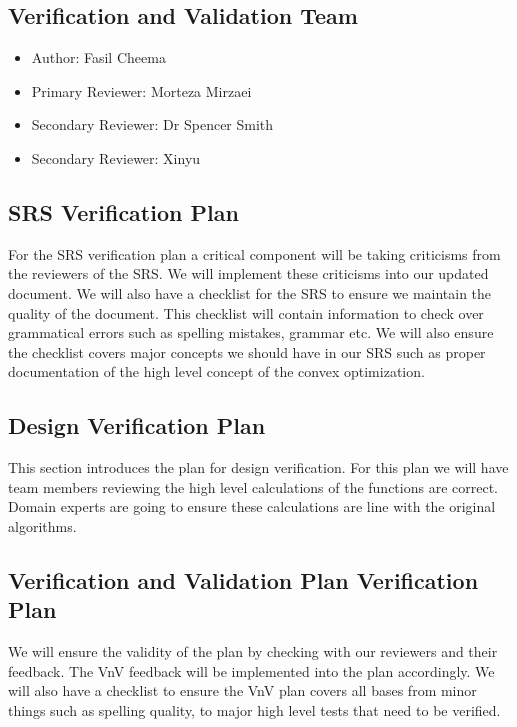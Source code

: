 \documentclass[12pt, titlepage]{article}
\begin{document}
\subsection{Verification and Validation Team}

\begin{itemize}
  \item Author: Fasil Cheema
  \item Primary Reviewer: Morteza Mirzaei
  \item Secondary Reviewer: Dr Spencer Smith
  \item Secondary Reviewer: Xinyu
\end{itemize}

\subsection{SRS Verification Plan}
For the SRS verification plan a critical component will be taking criticisms from the 
reviewers of the SRS. We will implement these criticisms into our updated document. 
We will also have a checklist for the SRS to ensure we maintain the quality of the document. 
This checklist will contain information to check over grammatical errors such as spelling mistakes,
grammar etc. We will also ensure the checklist covers major concepts we should have in our SRS such 
as proper documentation of the high level concept of the convex optimization.

\subsection{Design Verification Plan}


This section introduces the plan for design verification. For this plan we will have 
team members reviewing the high level calculations of the functions are correct.
Domain experts are going to ensure these calculations are line with the original 
algorithms.

\subsection{Verification and Validation Plan Verification Plan}

We will ensure the validity of the plan by checking with our reviewers and
their feedback. The VnV feedback will be implemented into the plan accordingly.
We will also have a checklist to ensure the VnV plan covers all bases from minor 
things such as spelling quality, to major high level tests that need to be verified.
\end{document}
